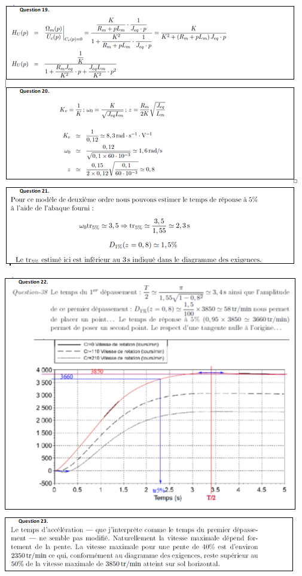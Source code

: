\documentclass[10pt,fleqn]{article} %
\begin{document}
\begin{center}
	\includegraphics[width=.9\linewidth]{images/cor_03}
\end{center}

\begin{center}
	\includegraphics[width=.9\linewidth]{images/cor_04}
\end{center}
\end{document}
